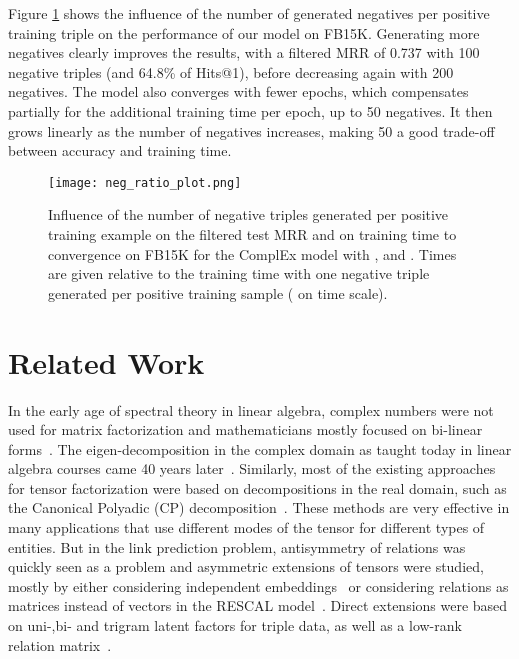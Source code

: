 \documentclass{article}
\begin{document}
Figure \ref{fig:neg_ratio} shows the influence of the number of generated negatives per positive training triple on the performance of our model on FB15K.
Generating more negatives clearly improves the results, with a filtered MRR of 0.737  with 100 negative triples (and 64.8\% of Hits@1), before decreasing again with 200 negatives. The model also converges with fewer epochs, which compensates partially for the additional training time per epoch, up to 50 negatives. It then grows linearly as the number of negatives increases, making 50 a good trade-off between accuracy and training time. 


\begin{figure}[h]
	\centering
	\texttt{[image: neg\_ratio\_plot.png]}
	
    \caption{Influence of the number of negative triples generated per positive training example on the filtered test MRR and on training time to convergence on FB15K for the ComplEx model with ,  and . Times are given relative to the training time with one negative triple generated per positive training sample ( on time scale).}
	\label{fig:neg_ratio}
	
\end{figure}





























\section{Related Work}
In the early age of spectral theory in linear algebra, complex numbers were not used 
for matrix factorization and mathematicians mostly focused on bi-linear forms~\cite{beltrami1873sulle}. 
The eigen-decomposition in the complex domain as taught today in linear algebra courses 
came 40 years later~\cite{autonne1915}. Similarly, most of the existing approaches for tensor 
factorization were based on decompositions in the real domain, such as the Canonical Polyadic (CP) decomposition~\cite{hitchcock-sum-1927}. These methods are very effective in many applications 
that use different modes of the tensor for different types of entities.
But in the link prediction problem, antisymmetry of relations was quickly seen as 
a problem and asymmetric extensions of tensors were studied, mostly by either
considering independent embeddings~\cite{sutskever2009} or considering relations as
matrices instead of vectors in the RESCAL model~\cite{Nickel2011}. 
Direct extensions were based on uni-,bi- and trigram latent factors for triple data, as well as a low-rank relation matrix~\cite{Jenatton2012}. 
\end{document}

